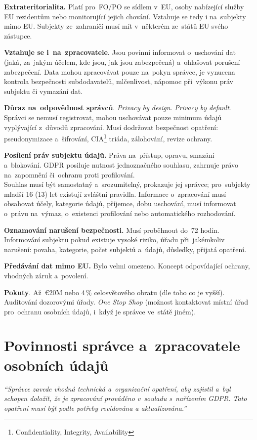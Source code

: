 \textbf{Extrateritorialita.} Platí pro~FO/PO se sídlem v~EU, osoby nabízející služby EU rezidentům nebo monitorující jejich chování. Vztahuje se tedy i na~subjekty mimo EU. Subjekty ze~zahraničí musí mít v~některém ze~států EU svého zástupce.

\textbf{Vztahuje se i~na~zpracovatele}. Jsou povinni informovat o~uschování dat (jaká, za~jakým účelem, kde jsou, jak jsou zabezpečená) a~ohlašovat porušení zabezpečení. Data mohou zpracovávat pouze na~pokyn správce, je vynucena kontrola bezpečnosti subdodavatelů, mlčenlivost, nápomoc při~výkonu práv subjektu či vymazání dat.

\textbf{Důraz na~odpovědnost správců}. \emph{Privacy by design}. \emph{Privacy by default}. Správci se nemusí registrovat, mohou uschovávat pouze minimum údajů vyplývající z~důvodů zpracování. Musí dodržovat bezpečnost opatření: pseudonymizace a~šifrování, CIA\footnote{Confidentiality, Integrity, Availability} triáda, zálohování, revize ochrany.

\textbf{Posílení práv subjektu údajů.} Práva na~přístup, opravu, smazání a~blokování. GDPR posiluje nutnost jednoznačného souhlasu, zahrnuje právo na~zapomnění či~ochranu proti profilování. \\
Souhlas musí být samostatný a~srozumitelný, prokazuje jej správce; pro~subjekty mladší 16 (13) let existují zvláštní pravidla. Informace o~zpracování musí obsahovat účely, kategorie údajů, příjemce, dobu uschování, musí informovat o~právu na~výmaz, o~existenci profilování nebo automatického rozhodování.

\textbf{Oznamování narušení bezpečnosti.} Musí proběhnout do~72 hodin. Informování subjektu pokud existuje vysoké riziko, úřadu při~jakémkoliv narušení: povaha, kategorie, počet subjektů a~údajů, důsledky, přijatá opatření.

\textbf{Předávání dat mimo EU.} Bylo velmi omezeno. Koncept odpovídající ochrany, vhodných záruk a~povolení.

\textbf{Pokuty}. Až~€20M nebo 4\,\% celosvětového obratu (dle toho co je vyšší). Auditování dozorovými úřady. \emph{One Stop Shop} (možnost kontaktovat místní úřad pro~ochranu osobních údajů, i~když je správce ve~státě jiném).

\clearpage
\section{Povinnosti správce a~zpracovatele osobních údajů}
\label{question-7}

\emph{\enquote{Správce zavede vhodná technická a~organizační opatření, aby zajistil a~byl schopen doložit, že je zpracování prováděno v~souladu s~nařízením GDPR. Tato opatření musí být podle potřeby revidována a aktualizována.}}

